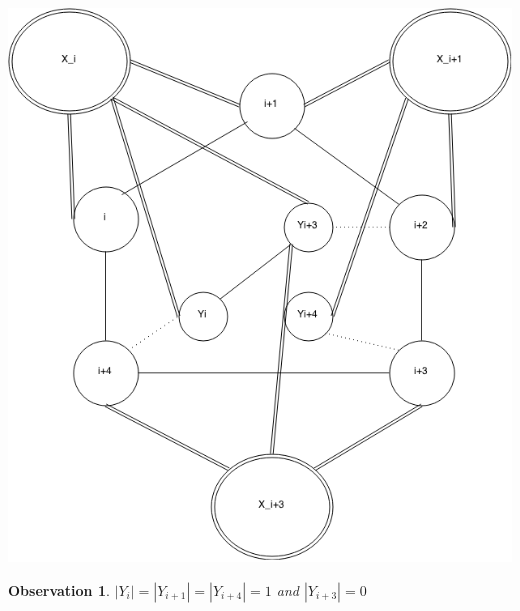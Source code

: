 \documentclass[12pt]{article}
\newtheorem{Observation}[Theorem]{Observation}
\begin{document}
\begin{minipage}{0.5\textwidth}\raggedleft
	\includegraphics[width=\linewidth]{Yi-Yi3-Yi4.png}
\end{minipage}


\begin{Observation}\label{obs:yi-yi1-yi4} 
$|Y_{i}| = |Y_{i+1}| = |Y_{i+4}| = 1$ and $|Y_{i+3}| = 0$
\end{Observation}
\end{document}
